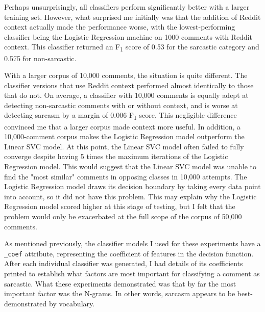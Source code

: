 \documentclass[a4paper,12pt]{article}
\begin{document}
Perhaps unsurprisingly, all classifiers perform significantly better with a larger training set. However, what surprised me initially was that the addition of Reddit context actually made the performance worse, with the lowest-performing classifier being the Logistic Regression machine on 1000 comments with Reddit context. This classifier returned an F\textsubscript{1} score of 0.53 for the sarcastic category and 0.575 for non-sarcastic.

With a larger corpus of 10,000 comments, the situation is quite different. The classifier versions that use Reddit context performed almost identically to those that do not. On average, a classifier with 10,000 comments is equally adept at detecting non-sarcastic comments with or without context, and is worse at detecting sarcasm by a margin of 0.006 F\textsubscript{1} score. This negligible difference convinced me that a larger corpus made context more useful. In addition, a 10,000-comment corpus makes the Logistic Regression model outperform the Linear SVC model. At this point, the Linear SVC model often failed to fully converge despite having 5 times the maximum iterations of the Logistic Regression model. This would suggest that the Linear SVC model was unable to find the "most similar" comments in opposing classes in 10,000 attempts. The Logistic Regression model draws its decision boundary by taking every data point into account, so it did not have this problem. This may explain why the Logistic Regression model scored higher at this stage of testing, but I felt that the problem would only be exacerbated at the full scope of the corpus of 50,000 comments.

As mentioned previously, the classifier models I used for these experiments have a \texttt{\_coef} attribute, representing the coefficient of features in the decision function. After each individual classifier was generated, I had details of its coefficients printed to establish what factors are most important for classifying a comment as sarcastic. What these experiments demonstrated was that by far the most important factor was the N-grams. In other words, sarcasm appears to be best-demonstrated by vocabulary.
\end{document}
